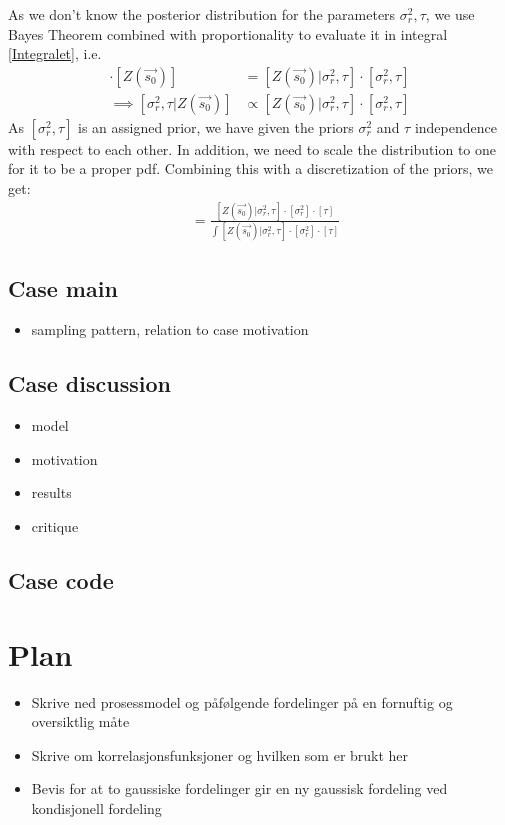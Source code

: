\documentclass{report}
\begin{document}
As we don't know the posterior distribution for the parameters $\sigma_r^2, \tau$, we use Bayes Theorem combined with proportionality to evaluate it in integral \ref{Integralet}, i.e.
\begin{align*}
[\sigma_r^2, \tau | Z(\vec{s_0})] \cdot [Z(\vec{s_0})] &= [Z(\vec{s_0}) | \sigma_r^2, \tau] \cdot [\sigma_r^2, \tau] \\
\implies [\sigma_r^2, \tau | Z(\vec{s_0})] &\propto [Z(\vec{s_0}) | \sigma_r^2, \tau] \cdot [\sigma_r^2, \tau]
\end{align*}
As $[\sigma_r^2, \tau]$ is an assigned prior, we have given the priors $\sigma_r^2$ and $\tau$ independence with respect to each other. In addition, we need to scale the distribution to one for it to be a proper pdf. Combining this with a discretization of the priors, we get:
\begin{align*}
[\sigma_r^2, \tau | Z(\vec{s_0})] &= \frac{[Z(\vec{s_0}) | \sigma_r^2, \tau] \cdot [\sigma_r^2]\cdot [\tau]} {\int [Z(\vec{s_0}) | \sigma_r^2, \tau] \cdot [\sigma_r^2]\cdot [\tau] }
\end{align*}

\subsection{Case main}
\begin{itemize}
\item sampling pattern,  relation to case motivation
\end{itemize}
\subsection{Case discussion}
\begin{itemize}
\item model
\item motivation
\item results
\item critique
\end{itemize}
\subsection{Case code}

\section{Plan}
\begin{itemize}
\item Skrive ned prosessmodel og påfølgende fordelinger på en fornuftig og oversiktlig måte
\item Skrive om korrelasjonsfunksjoner og hvilken som er brukt her 
\item Bevis for at to gaussiske fordelinger gir en ny gaussisk fordeling ved kondisjonell fordeling
\end{itemize}
\end{document}
